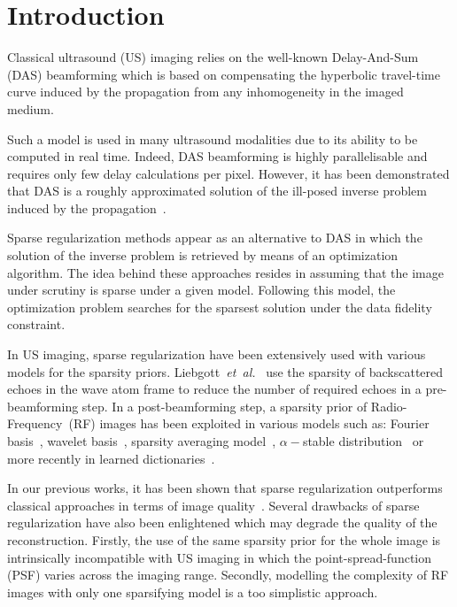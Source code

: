 \documentclass[conference]{IEEEtran}
\begin{document}
\IEEEpeerreviewmaketitle

\section{Introduction}
\par Classical ultrasound (US) imaging relies on the well-known Delay-And-Sum (DAS) beamforming which is based on compensating the hyperbolic travel-time curve induced by the propagation from any inhomogeneity in the imaged medium.
\par Such a model is used in many ultrasound modalities due to its ability to be computed in real time. Indeed, DAS beamforming is highly parallelisable and requires only few delay calculations per pixel. However, it has been demonstrated that DAS is a roughly approximated solution of the ill-posed inverse problem induced by the propagation~\cite{David_JASA_2015}. 
\par Sparse regularization methods appear as an alternative to DAS in which the solution of the inverse problem is retrieved by means of an optimization algorithm. The idea behind these approaches resides in assuming that the image under scrutiny is sparse under a given model. Following this model, the optimization problem searches for the sparsest solution under the data fidelity constraint.
\par In US imaging, sparse regularization have been extensively used with various models for the sparsity priors. Liebgott~\textit{et~al.}~\cite{Liebgott_Ult_2013} use the sparsity of backscattered echoes in the wave atom frame to reduce the number of required echoes in a pre-beamforming step. In a post-beamforming step, a sparsity prior of Radio-Frequency~(RF) images has been exploited in various models such as: Fourier basis~\cite{Quinsac2012}, wavelet basis~\cite{Quinsac2012}, sparsity averaging model~\cite{Carrillo_IUS_2015, Besson_ICIP_2016}, $\alpha-$stable distribution~\cite{Dobigeon2012} or more recently in learned dictionaries~\cite{Lorintiu_TMI_2015}.
\par In our previous works, it has been shown that sparse regularization outperforms classical approaches in terms of image quality~\cite{Carrillo_IUS_2015, Besson_EUSIPCO_2016, Besson_UFFC_2016}. Several drawbacks of sparse regularization have also been enlightened which may degrade the quality of the reconstruction. Firstly, the use of the same sparsity prior for the whole image is intrinsically incompatible with US imaging in which the point-spread-function (PSF) varies across the imaging range. Secondly, modelling the complexity of RF images with only one sparsifying model is a too simplistic approach.
\end{document}
